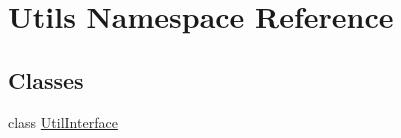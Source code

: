 \hypertarget{namespaceUtils}{}\section{Utils Namespace Reference}
\label{namespaceUtils}
\subsection*{Classes}
\begin{DoxyCompactItemize}
\item 
class \hyperlink{classUtils_1_1UtilInterface}{Util\+Interface}
\end{DoxyCompactItemize}
